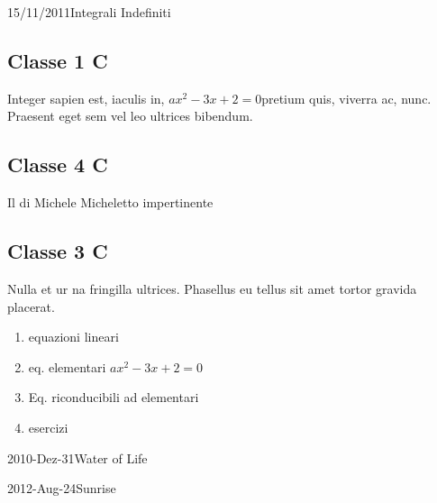 \documentclass[10pt, twoside, notitlepage, notoc, justified]{tufte-handout}
\begin{document}
 \begin{loggentry}{15/11/2011}{Integrali Indefiniti}
 	\subsection{Classe 1 C}
 	 Integer sapien est, iaculis in, \(a x^2 - 3 x + 2 = 0\)pretium quis, viverra ac, nunc. Praesent eget sem vel leo ultrices bibendum.
 	 \subsection{Classe 4 C}
 	  Il di Michele Micheletto impertinente
 	 \subsection{Classe 3 C}
 	 Nulla et ur na fringilla ultrices. Phasellus eu tellus sit amet tortor gravida placerat.
 	 \begin{enumerate}
 	 	\item equazioni lineari
 	 	\item eq. elementari \(a x^2 - 3 x + 2 = 0\)
 	 	\item Eq. riconducibili ad elementari
 	 	\item esercizi
 	 \end{enumerate}
 \end{loggentry}
  
\begin{loggentry}{2010-Dez-31}{Water of Life}
\lipsum[9] 
\end{loggentry}

 \begin{loggentry}{2012-Aug-24}{Sunrise}
\lipsum[6]
\end{loggentry}
\end{document}

